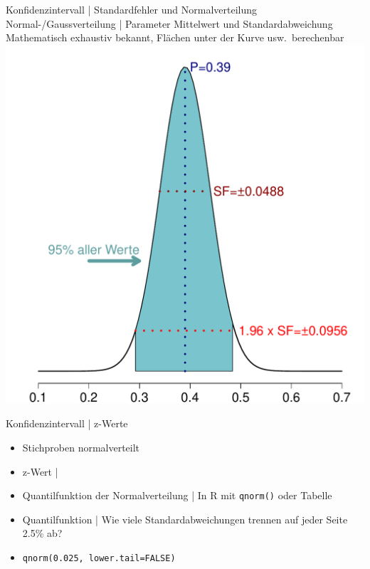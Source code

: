 \begin{frame}
  {Konfidenzintervall | Standardfehler und Normalverteilung}
  \alert{Normal-\slash Gaussverteilung} | Parameter \alert{Mittelwert} und \alert{Standardabweichung}\\
  \Viertelzeile
   Mathematisch exhaustiv bekannt, Flächen unter der Kurve usw.\ berechenbar\\
  \centering
  \includegraphics[height=0.75\textheight]{RVorlesung/ci95}
\end{frame}


\begin{frame}
  {Konfidenzintervall | z-Werte}
  \begin{itemize}[<+->]
    \item Stichproben \alert{normalverteilt} 
    \item \alert{z-Wert} | 
      \Zeile
    \item \alert{Quantilfunktion der Normalverteilung} | In R mit \alert{\texttt{qnorm()}} oder \alert{Tabelle}
    \item Quantilfunktion | Wie viele Standardabweichungen trennen auf jeder Seite 2.5\% ab?
    \item \alert{\texttt{qnorm(0.025, lower.tail=FALSE)}}  
  \end{itemize}
\end{frame}

